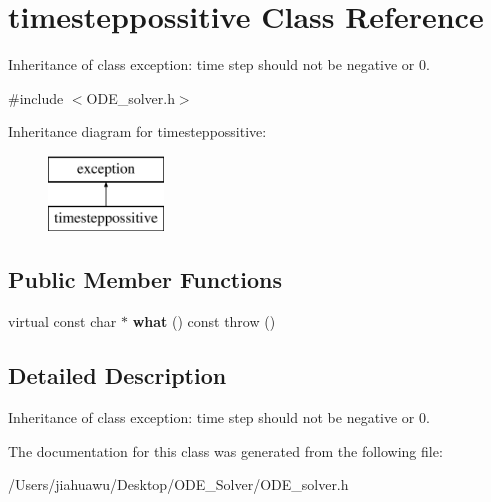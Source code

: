 \hypertarget{classtimesteppossitive}{}\section{timesteppossitive Class Reference}
\label{classtimesteppossitive}


Inheritance of class exception\+: time step should not be negative or 0.  




{\ttfamily \#include $<$O\+D\+E\+\_\+solver.\+h$>$}

Inheritance diagram for timesteppossitive\+:\begin{figure}[H]
\begin{center}
\leavevmode
\includegraphics[height=2.000000cm]{classtimesteppossitive}
\end{center}
\end{figure}
\subsection*{Public Member Functions}
\begin{DoxyCompactItemize}
\item 
\mbox{\label{classtimesteppossitive_acd3f5fd077ab556acf7f5abf73c87e3c}} 
virtual const char $\ast$ {\bfseries what} () const  throw ()
\end{DoxyCompactItemize}


\subsection{Detailed Description}
Inheritance of class exception\+: time step should not be negative or 0. 

The documentation for this class was generated from the following file\+:\begin{DoxyCompactItemize}
\item 
/\+Users/jiahuawu/\+Desktop/\+O\+D\+E\+\_\+\+Solver/O\+D\+E\+\_\+solver.\+h\end{DoxyCompactItemize}
